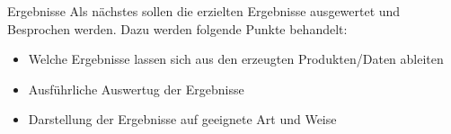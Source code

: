%
\begin{simplebox}{Ergebnisse}
%
Als nächstes sollen die erzielten Ergebnisse ausgewertet und Besprochen werden.
Dazu werden folgende Punkte behandelt:
%
\begin{itemize}
\item Welche Ergebnisse lassen sich aus den erzeugten Produkten/Daten ableiten
\item Ausführliche Auswertug der Ergebnisse
\item Darstellung der Ergebnisse auf geeignete Art und Weise
\end{itemize}
%
\end{simplebox}
%